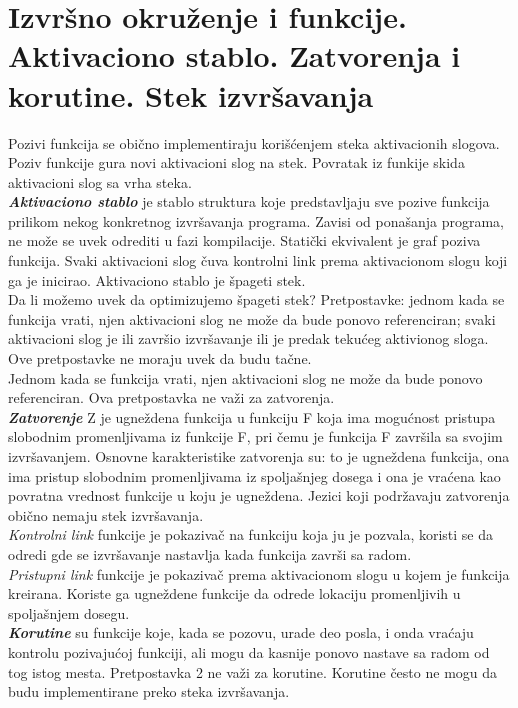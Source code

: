 \documentclass[10pt]{extarticle}
\begin{document}
\section{Izvršno okruženje i funkcije. Aktivaciono stablo. Zatvorenja i korutine. Stek izvršavanja}
\noindent
Pozivi funkcija se obično implementiraju korišćenjem steka aktivacionih slogova. Poziv funkcije gura novi aktivacioni slog na stek. Povratak iz funkije skida aktivacioni slog sa vrha steka.\\
\textit{\textbf{Aktivaciono stablo}} je stablo struktura koje predstavljaju sve pozive funkcija prilikom nekog konkretnog izvršavanja programa. Zavisi od ponašanja programa, ne može se uvek odrediti u fazi kompilacije. Statički ekvivalent je graf poziva funkcija. Svaki aktivacioni slog čuva kontrolni link prema aktivacionom slogu koji ga je inicirao. Aktivaciono stablo je špageti stek. \\
Da li možemo uvek da optimizujemo špageti stek? Pretpostavke: jednom kada se funkcija vrati, njen aktivacioni slog ne može da bude ponovo referenciran; svaki aktivacioni slog je ili završio izvršavanje ili je predak tekućeg aktivionog sloga. Ove pretpostavke ne moraju uvek da budu tačne.\\
Jednom kada se funkcija vrati, njen aktivacioni slog ne može da bude ponovo referenciran. Ova pretpostavka ne važi za zatvorenja. \\
\textit{\textbf{Zatvorenje}} Z je ugneždena funkcija u funkciju F koja ima mogućnost pristupa slobodnim promenljivama iz funkcije F, pri čemu je funkcija F završila sa svojim izvršavanjem. Osnovne karakteristike zatvorenja su: to je ugneždena funkcija, ona ima pristup slobodnim promenljivama iz spoljašnjeg dosega i ona je vraćena kao povratna vrednost funkcije u koju je ugneždena. Jezici koji podržavaju zatvorenja obično nemaju stek izvršavanja. \\
\textit{Kontrolni link} funkcije je pokazivač na funkciju koja ju je pozvala, koristi se da odredi gde se izvršavanje nastavlja kada funkcija završi sa radom.\\
\textit{Pristupni link} funkcije je pokazivač prema aktivacionom slogu u kojem je funkcija kreirana. Koriste ga ugneždene funkcije da odrede lokaciju promenljivih u spoljašnjem dosegu. \\
\textit{\textbf{Korutine}} su funkcije koje, kada se pozovu, urade deo posla, i onda vraćaju kontrolu pozivajućoj funkciji, ali mogu da kasnije ponovo nastave sa radom od tog istog mesta. Pretpostavka 2 ne važi za korutine. Korutine često ne mogu da budu implementirane preko steka izvršavanja. \\
\end{document}
